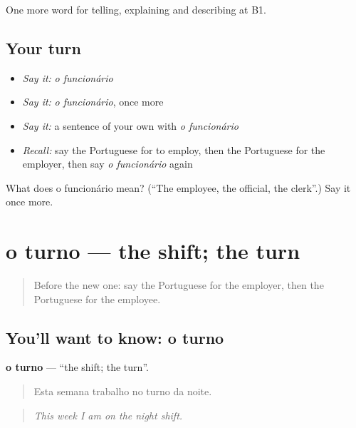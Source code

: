\begin{grammarlens}[title={What you've built}]
One more word for telling, explaining and describing at B1.
\end{grammarlens}

\subsection*{Your turn}
\begin{itemize}
\raggedright
  \item \emph{Say it:} \emph{o funcionário}
  \item \emph{Say it:} \emph{o funcionário}, once more
  \item \emph{Say it:} a sentence of your own with \emph{o funcionário}
  \item \emph{Recall:} say the Portuguese for to employ, then the Portuguese for the employer, then say \emph{o funcionário} again
\end{itemize}

\begin{tcolorbox}[breakable,colback=teal!4,colframe=teal!35!black,title={Before you move on}]
What does o funcionário mean? (\textquotedblleft{}The employee, the official, the clerk\textquotedblright{}.) Say it once more.
\end{tcolorbox}
\section[o turno]{o turno — the shift; the turn}

\label{lesson:PT-C358-turno}



\begin{quote}
Before the new one: say the Portuguese for the employer, then the Portuguese for the employee.
\end{quote}

\subsection*{You'll want to know: o turno}
\textbf{o turno} — \textquotedblleft{}the shift; the turn\textquotedblright{}.

\begin{quote}
Esta semana trabalho no turno da noite.
\end{quote}

\begin{quote}
\emph{This week I am on the night shift.}
\end{quote}

